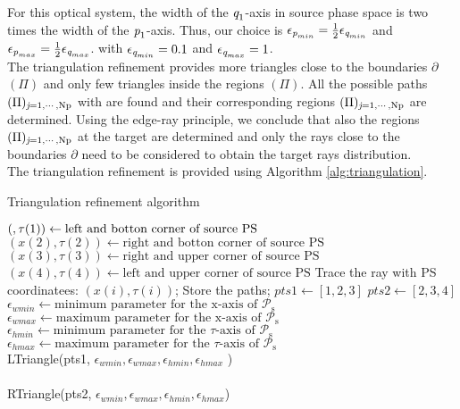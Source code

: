 For this optical system, the width of the $\textit{q}_1$-axis in source phase space is two times the width of the $\textit{p}_1$-axis.
Thus, our choice is $\epsilon_{\textit{p}_{min}}=\frac{1}{2}\epsilon_{\textit{q}_{min}}$ and $\epsilon_{\textit{p}_{max}} = \frac{1}{2}\epsilon_{\textit{q}_{max}}$.
with $\epsilon_{\textit{q}_{min}}=0.1$ and $\epsilon_{\textit{q}_{max}}=1$.
\\ \indent
The triangulation refinement provides more triangles close to the boundaries $\partial$$(\Pi)$ and only few triangles inside the regions $(\Pi)$.
All the possible paths $(\Pi)_{\textit{j} = 1, \cdots, \textrm{Np}}$ with are found and their corresponding regions $(\Pi)_{\textit{j} = 1, \cdots, \textrm{Np}}$ are determined. Using the edge-ray principle, we conclude that also the regions $(\Pi)_{\textit{j} = 1, \cdots, \textrm{Np}}$ at the target are determined and only the rays close to the boundaries
$\partial$ need to be considered to obtain the target rays distribution.
\\ \indent The triangulation refinement is provided using Algorithm \ref{alg:triangulation}.
 \\ \indent
\begin{algorithm}
\caption{Triangulation refinement algorithm}\label{alg:triangulation}
\begin{algorithmic}[1]
\State $(\textit{}, \tau(1))\gets \mbox{left and  botton corner of source PS}$
\State $(x(2), \tau(2))\gets \mbox{right and  botton corner of source PS}$
\State $(x(3), \tau(3)) \gets \mbox{right and upper corner of source PS}$
\State $(x(4), \tau(4)) \gets \mbox{left and upper corner of source PS} $
\State Trace the ray with PS coordinatees: $(x(i), \tau(i))$;
\State Store the paths;
\EndFor
\State $pts1 \gets [1, 2, 3]$ 
\State $pts2 \gets [2,3, 4]$   
\State $\epsilon_{wmin} \gets \mbox{minimum parameter for the x-axis of } \mathcal{P}_\textrm{s}$
\State $\epsilon_{wmax} \gets \mbox{maximum parameter for the x-axis of } \mathcal{P}_\textrm{s}$
\State $\epsilon_{hmin}\gets  \mbox{minimum parameter for the $\tau$-axis of } \mathcal{P}_\textrm{s}$
\State $\epsilon_{hmax}\gets  \mbox{maximum parameter for the $\tau$-axis of } \mathcal{P}_\textrm{s}$ \\
LTriangle(pts1, $\epsilon_{wmin}, \epsilon_{wmax},\epsilon_{hmin}, \epsilon_{hmax}$ ) \\  \\
RTriangle(pts2, $\epsilon_{wmin}, \epsilon_{wmax},\epsilon_{hmin}, \epsilon_{hmax}$) \\ 
\EndProcedure
\end{algorithmic}
\end{algorithm}
